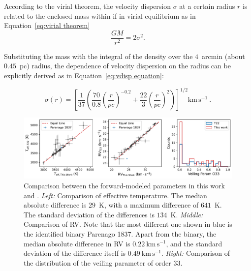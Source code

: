 \documentclass[12pt]{ucsddissertation}
\begin{document}
\begin{CJK*}{UTF8}{gbsn}
\noindent According to the virial theorem, the velocity dispersion $\sigma$ at a certain radius $r$ is related to the enclosed mass within if in virial equilibrium as in Equation~\ref{eq:virial theorem}
\begin{equation}
    \label{eq:virial theorem}
    \frac{GM}{r^2} = 2\sigma^2.
\end{equation}

\noindent Substituting the mass with the integral of the density over the $4$~arcmin (about $0.45$~pc) radius, the dependence of velocity dispersion on the radius can be explicitly derived as in Equation~\ref{eq:vdisp equation}:

\begin{equation}
    \label{eq:vdisp equation}
    \sigma\left(r\right) = \left[\frac{1}{37}\left(\frac{70}{0.8}\left(\frac{r}{pc}\right)^{-0.2} + \frac{22}{3}\left(\frac{r}{pc}\right)^2\right)\right]^{1/2} \mathrm{km}\,\mathrm{s}^{-1}~.
\end{equation}

\begin{figure}[htb!]
    \centering
    \includegraphics[width=\linewidth]{figures/chapter1/compare_T22.pdf}
    \caption[Effective temperature and radial velocity comparison]{Comparison between the forward-modeled parameters in this work and . \textit{Left:} Comparison of effective temperature. The median absolute difference is $29$~K, with a maximum difference of $641$~K. The standard deviation of the differences is $134$~K. \textit{Middle:} Comparison of RV. Note that the most different one shown in blue is the identified binary Parenago 1837. Apart from the binary, the median absolute difference in RV is $0.22~\mathrm{km}\,\mathrm{s}^{-1}$, and the standard deviation of the difference itself is $0.49~\mathrm{km}\,\mathrm{s}^{-1}$. \textit{Right:} Comparison of the distribution of the veiling parameter of order 33.}
    \label{fig:compare T22}
\end{figure}


\end{CJK*}
\end{document}
